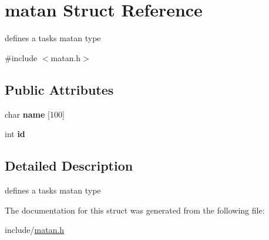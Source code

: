 \hypertarget{structmatan}{}\section{matan Struct Reference}
\label{structmatan}


defines a tasks matan type  




{\ttfamily \#include $<$matan.\+h$>$}

\subsection*{Public Attributes}
\begin{DoxyCompactItemize}
\item 
char {\bfseries name} \mbox{[}100\mbox{]}\hypertarget{structmatan_ac50516d5800781ea80f361bf268cee21}{}\label{structmatan_ac50516d5800781ea80f361bf268cee21}

\item 
int {\bfseries id}\hypertarget{structmatan_ac68eae3b7f0955c4c10256d7a529c595}{}\label{structmatan_ac68eae3b7f0955c4c10256d7a529c595}

\end{DoxyCompactItemize}


\subsection{Detailed Description}
defines a tasks matan type 

The documentation for this struct was generated from the following file\+:\begin{DoxyCompactItemize}
\item 
include/\hyperlink{matan_8h}{matan.\+h}\end{DoxyCompactItemize}

